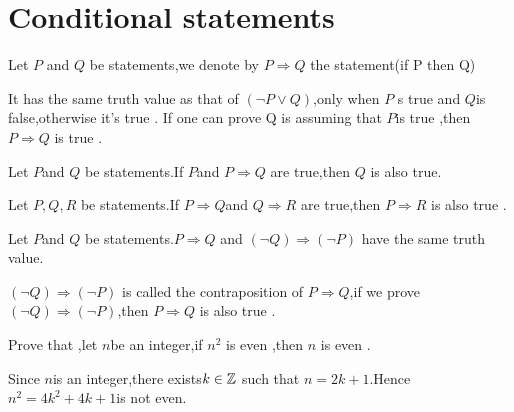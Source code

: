 \documentclass{book}
\begin{document}
\section{Conditional statements}
\begin{definitionenv}
    Let $P$ and $Q$ be statements,we denote by $P\Rightarrow Q$ the statement(if P then Q)
\end{definitionenv}
\begin{remark}
    It has the same truth value as that of $(\neg P\vee Q)$,only when $P$ s true and $Q$is false,otherwise it's true .
    \newline
    If one can prove Q is assuming that $P$is true ,then $P\Rightarrow Q$ is true .
\end{remark}
\begin{propositionenv}
    Let $P$and $Q$ be statements.If $P$and $P\Rightarrow Q$ are true,then $Q$ is also true.
\end{propositionenv}
\begin{propositionenv}
    Let $P,Q,R$ be statements.If $P \Rightarrow Q$and $Q\Rightarrow R$ are true,then $P\Rightarrow R$ is also true .
\end{propositionenv}
\begin{theoremenv}
    Let $P$and $Q$ be statements.$P\Rightarrow Q$ and $(\neg Q)\Rightarrow (\neg P)$ have the same truth value.
\end{theoremenv}
$(\neg Q)\Rightarrow (\neg P)$ is called the contraposition of $P\Rightarrow Q$,if we prove $(\neg Q)\Rightarrow (\neg P)$,then $P\Rightarrow Q$ is also true .
\begin{exampleenv}
    Prove that ,let $n$be an integer,if $n^2$ is even ,then $n$ is even .
    \begin{proofenv}
        Since $n$is an integer,there exists$k\in \mathbb{Z}$ such that $n=2k+1$.Hence $n^2=4k^2+4k+1$is not even.
    \end{proofenv}
\end{exampleenv}
\end{document}
